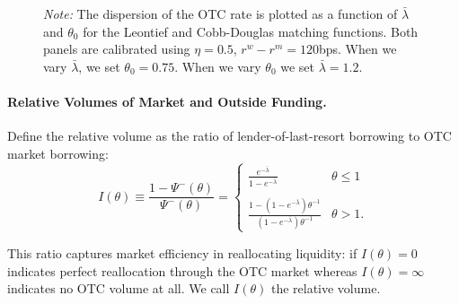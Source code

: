 \documentclass[12pt,american,english,notitlepage]{article}
\begin{document}
\begin{figure}[htb]
\parbox[b]{0.99 \textwidth} {\footnotesize \emph{Note:} 
The dispersion of
the OTC rate is plotted as a function of $\bar{\lambda}$ and $\theta_{0}$
for the Leontief and Cobb-Douglas matching functions. Both panels
are calibrated using $\eta=0.5$, $r^{w}-r^{m}=120$bps. When we vary
$\bar{\lambda}$, we set $\theta_{0}=0.75$. When we vary $\theta_{0}$
we set $\bar{\lambda}=1.2$.}
\end{figure}

\paragraph*{Relative Volumes of Market and Outside Funding.}

Define the relative volume as the ratio of lender-of-last-resort borrowing
to OTC market borrowing:
\[
I\left(\theta\right)\equiv\frac{1-\Psi^{-}\left(\theta\right)}{\Psi^{-}\left(\theta\right)}=\begin{cases}
\frac{e^{-\bar{\lambda}}}{1-e^{-\bar{\lambda}}} & \theta\leq1\\
\\\frac{1-\left(1-e^{-\bar{\lambda}}\right)\theta^{-1}}{\left(1-e^{-\bar{\lambda}}\right)\theta^{-1}} & \theta>1.
\end{cases}
\]

This ratio captures market efficiency in reallocating liquidity: if
$I\left(\theta\right)=0$ indicates perfect reallocation through the
OTC market whereas $I\left(\theta\right)=\infty$ indicates no OTC
volume at all. We call $I\left(\theta\right)$ the relative volume.

\end{document}
